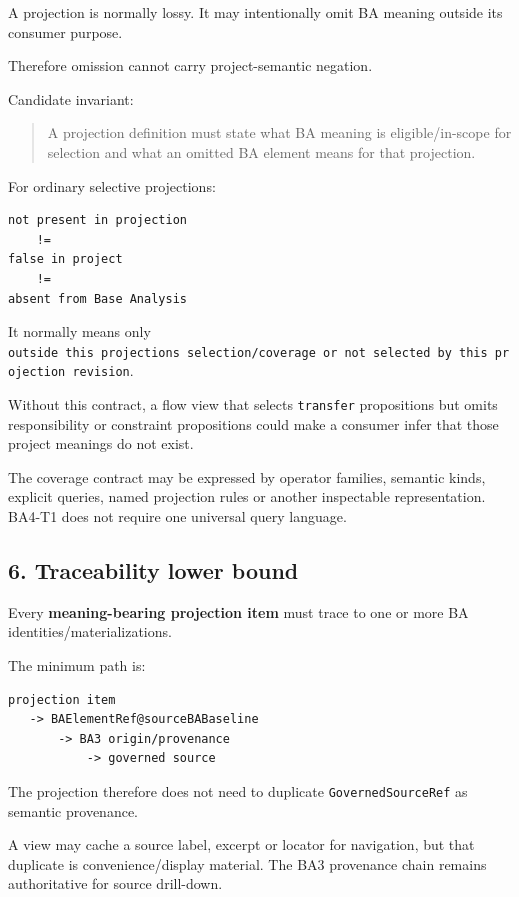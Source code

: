 \documentclass[11pt,a4paper]{article}
\begin{document}
A projection is normally lossy. It may intentionally omit BA meaning outside its consumer purpose.

Therefore omission cannot carry project-semantic negation.

Candidate invariant:

\begin{quote}
A projection definition must state what BA meaning is eligible/in-scope for selection and what an omitted BA element means for that projection.
\end{quote}

For ordinary selective projections:

\begin{verbatim}
not present in projection
    !=
false in project
    !=
absent from Base Analysis
\end{verbatim}

It normally means only \texttt{outside\ this\ projection\textquotesingle{}s\ selection/coverage\ or\ not\ selected\ by\ this\ projection\ revision}.

Without this contract, a flow view that selects \texttt{transfer} propositions but omits responsibility or constraint propositions could make a consumer infer that those project meanings do not exist.

The coverage contract may be expressed by operator families, semantic kinds, explicit queries, named projection rules or another inspectable representation. BA4-T1 does not require one universal query language.

\subsection{6. Traceability lower bound}\label{6-traceability-lower-bound}

Every \textbf{meaning-bearing projection item} must trace to one or more BA identities/materializations.

The minimum path is:

\begin{verbatim}
projection item
   -> BAElementRef@sourceBABaseline
       -> BA3 origin/provenance
           -> governed source
\end{verbatim}

The projection therefore does not need to duplicate \texttt{GovernedSourceRef} as semantic provenance.

A view may cache a source label, excerpt or locator for navigation, but that duplicate is convenience/display material. The BA3 provenance chain remains authoritative for source drill-down.
\end{document}
